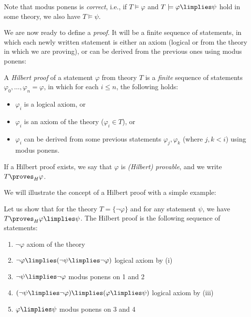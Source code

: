 Note that modus ponens is \emph{correct}, i.e., if $T \models \varphi$ and $T \models \varphi \limplies \psi$ hold in some theory, we also have $T \models \psi$.

We are now ready to define a \emph{proof}. It will be a finite sequence of statements, in which each newly written statement is either an axiom (logical or from the theory in which we are proving), or can be derived from the previous ones using modus ponens:

\begin{definition}
    A \emph{Hilbert proof} of a statement $\varphi$ from theory $T$ is a \emph{finite} sequence of statements $\varphi_0, \dots, \varphi_n = \varphi$, in which for each $i \leq n$, the following holds:
    \begin{itemize}
    \item $\varphi_i$ is a logical axiom, or
    \item $\varphi_i$ is an axiom of the theory ($\varphi_i \in T$), or
    \item $\varphi_i$ can be derived from some previous statements $\varphi_j, \varphi_k$ (where $j, k < i$) using modus ponens.
    \end{itemize}
    If a Hilbert proof exists, we say that $\varphi$ is \emph{(Hilbert) provable}, and we write $T \proves_H \varphi$.           
\end{definition}

We will illustrate the concept of a Hilbert proof with a simple example:

\begin{example}
Let us show that for the theory $T = \{\neg \varphi\}$ and for any statement $\psi$, we have $T \proves_H \varphi \limplies \psi$. The Hilbert proof is the following sequence of statements:
\begin{enumerate}\it
    \item $\neg \varphi$ \hfill axiom of the theory
    \item $\neg \varphi \limplies (\neg \psi \limplies \neg \varphi)$ \hfill logical axiom by (i)
    \item $\neg \psi \limplies \neg \varphi$ \hfill modus ponens on 1 and 2
    \item $(\neg \psi \limplies \neg \varphi) \limplies (\varphi \limplies \psi)$ \hfill logical axiom by (iii)
    \item $\varphi \limplies \psi$ \hfill modus ponens on 3 and 4 
\end{enumerate}
\end{example}

